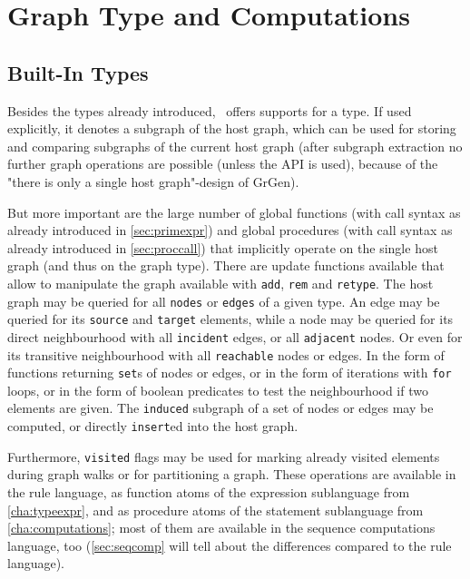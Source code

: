 \chapter{Graph Type and Computations}
\label{cha:graph}


\section{Built-In Types}
\label{sec:builtingenerictypes}
Besides the types already introduced, \GrG\ offers supports for a \texttt{} type.
If used explicitly, it denotes a subgraph of the host graph, which can be used for storing and comparing subgraphs of the current host graph (after subgraph extraction no further graph operations are possible (unless the API is used), because of the "there is only a single host graph"-design of GrGen).

But more important are the large number of global functions (with call syntax as already introduced in \ref{sec:primexpr}) and global procedures (with call syntax as already introduced in \ref{sec:proccall}) that implicitly operate on the single host graph (and thus on the graph type).
There are update functions available that allow to manipulate the graph available with \texttt{add}, \texttt{rem} and \texttt{retype}.
The host graph may be queried for all \texttt{nodes} or \texttt{edges} of a given type.
An edge may be queried for its \texttt{source} and \texttt{target} elements,
while a node may be queried for its direct neighbourhood with all \texttt{incident} edges, or all \texttt{adjacent} nodes.
Or even for its transitive neighbourhood with all \texttt{reachable} nodes or edges.
In the form of functions returning \texttt{set}s of nodes or edges, or in the form of iterations with \texttt{for} loops, or in the form of boolean predicates to test the neighbourhood if two elements are given.
The \texttt{induced} subgraph of a set of nodes or edges may be computed, or directly \texttt{insert}ed into the host graph.

Furthermore, \texttt{visited} flags may be used for marking already visited elements during graph walks or for partitioning a graph.
These operations are available in the rule language, as function atoms of the expression sublanguage from \ref{cha:typeexpr}, and as procedure atoms of the statement sublanguage from \ref{cha:computations}; 
most of them are available in the sequence computations language, too
(\ref{sec:seqcomp} will tell about the differences compared to the rule language).


